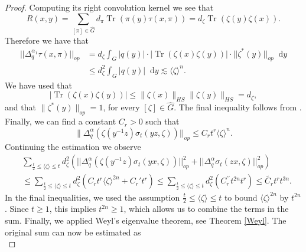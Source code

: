 \documentclass[12pt, reqno]{amsart}
\theoremstyle{definition}
\theoremstyle{remark}
\numberwithin{equation}{section}
\newcommand*\diff{\mathop{}\!\mathrm{d}}
\begin{document}
\begin{proof}
    Computing its right convolution kernel we see that 
    \begin{equation*}
        R(x,y)=\sum_{[\pi]\in\widehat{G}}d_\pi\operatorname{Tr}(\pi(y)\tau(x,\pi))=d_\zeta\operatorname{Tr}(\zeta(y)\zeta(x)).
    \end{equation*}
    Therefore we have that 
    \begin{equation*}
    \begin{aligned}
        ||\Delta^{\alpha_1}_{q}\tau(x,\pi)||_{op}&=d_\zeta\int_{G}|q(y)|\cdot|\operatorname{Tr}(\zeta(x)\zeta(y))|\cdot||\zeta^{*}(y)||_{op}\diff{y}\\
        &\leq d_\zeta^2\int_{G}|q(y)|\diff{y}\lesssim\langle\zeta\rangle^{n}.
    \end{aligned}
    \end{equation*}
    We have used that 
    \begin{equation*}
        |\operatorname{Tr}(\zeta(x)\zeta(y))|\leq\|\zeta(x)\|_{HS}\|\zeta(y)\|_{HS}=d_\zeta, 
    \end{equation*}
    and that $\|\zeta^*(y)\|_{op}=1$, for every $[\zeta]\in\widehat{G}$. The final inequality follows from \cite[Proposition 10.3.19]{17}. Finally, we can find a constant $C_r>0$ such that 
    \begin{equation*}
        \|\Delta_{q}^{\alpha}(\zeta(y^{-1}z)\sigma_t(yz,\zeta))||_{op}\leq C_rt^r\langle\zeta\rangle^{n}.
    \end{equation*}
    Continuing the estimation we observe  
    \begin{equation*}
    \begin{aligned}
        &\sum_{\frac{t}{2}\leq\langle\zeta\rangle\leq t}d_\zeta^2(||\Delta_{q}^{\alpha}(\zeta(y^{-1}z)\sigma_t(yx,\zeta))||^2_{op}+||\Delta_{q}^{\alpha}\sigma_t(zx,\zeta)||^{2}_{op})\\
        &\leq\sum_{\frac{t}{2}\leq\langle\zeta\rangle\leq t}d_\zeta^2(C_rt^r\langle\zeta\rangle^{2n}+C_r't^r)\leq\sum_{\frac{t}{2}\leq\langle\zeta\rangle\leq t}d_\zeta^2(C_r^{\prime\prime}t^{2n}t^r)\leq \widetilde{C_r}t^rt^{3n}.
    \end{aligned}
    \end{equation*}
    In the final inequalities, we used the assumption $\frac{t}{2}\leq\langle \zeta \rangle \le t$ to bound $\langle \zeta \rangle^{2n}$ by $t^{2n}$. Since $t \ge 1$, this implies $t^{2n} \ge 1$, which allows us to combine the terms in the sum. Finally, we applied Weyl’s eigenvalue theorem, see Theorem \ref{Weyl}. The original sum can now be estimated as
    \begin{equation*}

\end{equation*}
\end{proof}
\end{document}
